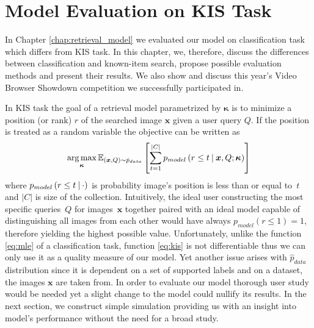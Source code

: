 \chapter{Model Evaluation on KIS Task}\label{chap:evaluation}
In Chapter \ref{chap:retrieval_model} we evaluated our model on classification task which differs from KIS task. In this chapter, we, therefore, discuss the differences between classification and known-item search, propose possible evaluation methods and present their results. We also show and discuss this year's Video Browser Showdown competition we successfully participated in.

In KIS task the goal of a retrieval model parametrized by $\bm{\kappa}$ is to minimize a position (or rank) $r$ of the searched image $\bm{x}$ given a user query $Q$. If the position is treated as a random variable the objective can be written as
\begin{equation}
\mathop{\arg\max}_{\bm{\kappa}}\mathbb{E}_{\left(\bm{x},Q\right)\sim \hat{p}_{data}}\left[
\sum_{t=1}^{|C|}p_{model}\left(r\leq t\:\vert\:\bm{x}, Q;\bm{\kappa}\right)
\right]\label{eq:kis}
\end{equation}
where $p_{model}\left(r\leq t\:\vert\:\cdot\right)$ is probability image's position is less than or equal to~$t$ and $|C|$ is size of the collection. Intuitively, the ideal user constructing the most specific queries~$Q$ for images~$\bm{x}$ together paired with an ideal model capable of distinguishing all images from each other would have always ${p_{model}\left(r\leq 1\right)=1}$, therefore yielding the highest possible value. Unfortunately, unlike the function \ref{eq:mle} of a classification task, function \ref{eq:kis} is not differentiable thus we can only use it as a quality measure of our model. Yet another issue arises with $\hat{p}_{data}$ distribution since it is dependent on a set of supported labels and on a dataset, the images $\bm{x}$ are taken from. In order to evaluate our model thorough user study would be needed yet a slight change to the model could nullify its results. In the next section, we construct simple simulation providing us with an insight into model's performance without the need for a broad study.

